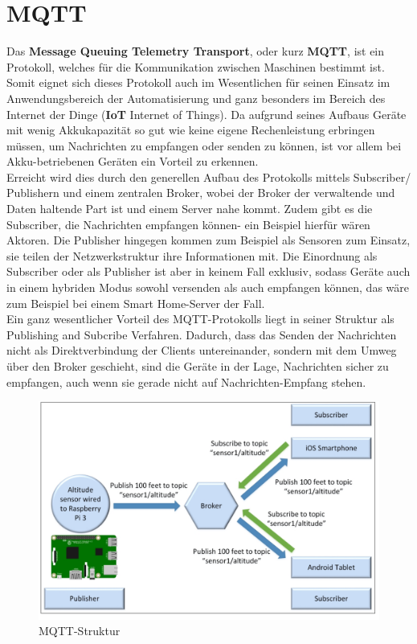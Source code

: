 \section{MQTT}
Das \textbf{Message Queuing Telemetry Transport}, oder kurz \textbf{MQTT}, ist ein Protokoll, welches für die Kommunikation zwischen Maschinen bestimmt ist. Somit eignet sich dieses Protokoll auch im Wesentlichen für seinen Einsatz im Anwendungsbereich der Automatisierung und ganz besonders im Bereich des Internet der Dinge (\textbf{IoT} Internet of Things). Da aufgrund seines Aufbaus Geräte mit wenig Akkukapazität so gut wie keine eigene Rechenleistung erbringen müssen, um Nachrichten zu empfangen oder senden zu können, ist vor allem bei Akku-betriebenen Geräten ein Vorteil zu erkennen.\\
Erreicht wird dies durch den generellen Aufbau des Protokolls mittels Subscriber/ Publishern und einem zentralen Broker, wobei der Broker der verwaltende und Daten haltende Part ist und einem Server nahe kommt. Zudem gibt es die Subscriber, die Nachrichten empfangen können- ein Beispiel hierfür wären Aktoren. Die Publisher hingegen kommen zum Beispiel als Sensoren zum Einsatz, sie teilen der Netzwerkstruktur ihre Informationen mit. Die Einordnung als Subscriber oder als Publisher ist aber in keinem Fall exklusiv, sodass Geräte auch in einem hybriden Modus sowohl versenden als auch empfangen können, das wäre zum Beispiel bei einem Smart Home-Server der Fall.\\
 Ein ganz wesentlicher Vorteil des MQTT-Protokolls liegt in seiner Struktur als Publishing and Subcribe Verfahren. Dadurch, dass das Senden der Nachrichten nicht als Direktverbindung der Clients untereinander, sondern mit dem Umweg über den Broker geschieht, sind die Geräte in der Lage, Nachrichten sicher zu empfangen, auch wenn sie gerade nicht auf Nachrichten-Empfang stehen.\cite{b1}
 \begin{figure}[h]
 \caption{MQTT-Struktur \cite{b1}}
 \centering
 \includegraphics[scale=0.4]{mqtt_structure}
 \end{figure}
